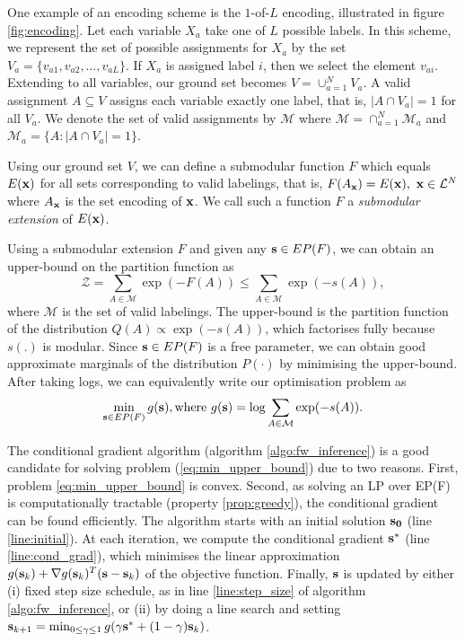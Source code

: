 One example of an encoding scheme is the $1$-of-$L$ encoding, illustrated in figure \ref{fig:encoding}. Let each variable $X_a$ take one of $L$ possible labels. In this scheme, we represent the set of possible assignments for $X_a$ by the set $V_a = \{v_{a1}, v_{a2}, \dots, v_{aL}\}$. If $X_a$ is assigned label $i$, then we select the element $v_{ai}$. Extending to all variables, our ground set becomes $V = \cup_{a = 1}^N V_a$. A valid assignment $A \subseteq V$ assigns each variable exactly one label, that is, $|A \cap V_a| = 1$ for all $V_a$. We denote the set of valid assignments by $\mathcal M$ where $\mathcal{M} = \cap_{a = 1}^{N} \mathcal{M}_a$ and $\mathcal{M}_a = \{A: |A \cap V_a| = 1\}$.


Using our ground set $V$, we can define a submodular function $F$ which equals $E(\bf x)$ for all sets corresponding to valid labelings, that is, $F(A_{\bf x}) = E({\bf x}),\ {\bf x} \in {\mathcal L}^N$ where $A_{\bf x}$ is the set encoding of $\bf x$. We call such a function $F$ a {\it submodular extension} of $E({\bf x})$. 

 Using a submodular extension $F$ and given any ${\bf s} \in EP(F)$, we can obtain an upper-bound on the partition function as
\begin{equation}
    {\mathcal Z} = \sum_{A \in {\mathcal M}} \exp(-F(A)) \leq \sum_{A \in {\mathcal M}} \exp(-s(A)),
\end{equation}
where $\mathcal M$ is the set of valid labelings. The upper-bound is the partition function of the distribution $Q(A) \propto \exp(-s(A))$, which factorises fully because $s(.)$ is modular. Since ${\bf s} \in EP(F)$ is a free parameter, we can obtain good approximate marginals of the distribution $P(\cdot)$ by minimising the upper-bound. After taking logs, we can equivalently write our optimisation problem as
\begin{equation}
  \min_{{\bf s} \in EP(F)} g({\bf s}), \text{where } g({\bf s}) = \log \sum_{A \in {\mathcal M}} \exp(-s(A)).
\label{eq:min_upper_bound}
\end{equation}

 The conditional gradient algorithm
(algorithm \ref{algo:fw_inference}) \citep{frank1956algorithm} is a good
candidate for solving problem (\ref{eq:min_upper_bound}) due to two reasons.
First, problem \eqref{eq:min_upper_bound} is convex. Second, as solving an LP
over EP(F) is computationally tractable (property \ref{prop:greedy}), the
conditional gradient can be found efficiently. The algorithm starts with an
initial solution $\bf s_0$ (line \ref{line:initial}). At each iteration, we
compute the conditional gradient $\bf s^*$ (line \ref{line:cond_grad}), which
minimises the linear approximation $g({\bf s}_k) + \nabla g({\bf s}_k)^T ({\bf
s} - {\bf s}_k)$ of the objective function. Finally, $\bf s$ is updated by
either (i) fixed step size schedule, as in line \ref{line:step_size} of
algorithm \ref{algo:fw_inference}, or (ii) by doing a line search and setting ${\bf s}_{k+1} = \min_{0 \leq \gamma \leq 1} g(\gamma {\bf s}^* + (1 - \gamma) {\bf s}_{k})$.

